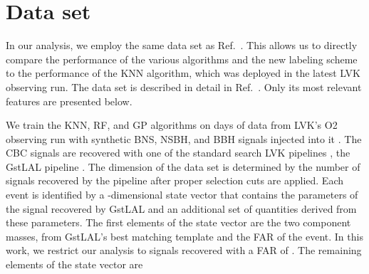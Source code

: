 \section{Data set\label{dataset}}
\label{sec:dataset}

In our analysis, we employ the same data set as Ref.\ . This allows us to directly compare the performance of the various algorithms and the new labeling
scheme to the performance of the \ac{KNN} algorithm, which was deployed in the latest \ac{LVK} observing run. The data set is described in detail in Ref.\ . Only its most relevant features are presented below.

We train the \ac{KNN}, \ac{RF}, and \ac{GP} algorithms on  days of data from \ac{LVK}'s \ac{O2} observing run with  synthetic \ac{BNS}, \ac{NSBH}, and \ac{BBH} signals
injected into it .  The \ac{CBC} signals are recovered with one of the standard search \ac{LVK} pipelines , the GstLAL
pipeline .  The dimension of the data set is determined by the number of signals recovered by the pipeline after
proper selection cuts are applied. Each event is identified by a -dimensional state vector that contains the parameters of the signal recovered by GstLAL and an additional set of
quantities derived from these parameters. The first  elements of the state vector are the two component masses,  from GstLAL's best matching
template and the \ac{FAR} of the event. In this work, we restrict our analysis to signals recovered with a \ac{FAR} of .  The remaining elements of the state
vector are  


